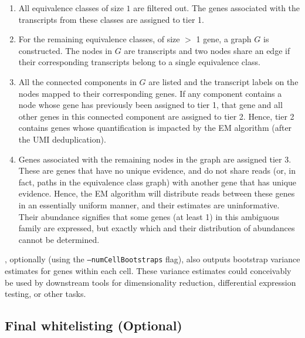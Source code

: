 \begin{enumerate}
  \item All equivalence classes of size $1$ are filtered out. The genes associated with the transcripts from these classes are assigned to tier 1.
  \item For the remaining equivalence classes, of size $>$ 1 gene, a graph $G$ is constructed. The nodes in $G$ are transcripts and two nodes share an edge if their corresponding transcripts belong to a single equivalence class. 
  \item All the connected components in $G$ are listed and the transcript labels on the nodes mapped to their corresponding genes. If any component contains a node whose gene has previously been assigned to tier 1, that gene and all other genes in this connected component are assigned to tier 2. Hence, tier 2 contains genes whose quantification is impacted by the EM algorithm (after the UMI deduplication). 
  \item Genes associated with the remaining nodes in the graph are assigned tier 3. These are genes that have no unique evidence, and do not share reads (or, in fact, paths in the equivalence class graph) with another gene that has unique evidence. Hence, the EM algorithm will distribute reads between these genes in an essentially uniform manner, and their estimates are uninformative.  Their abundance signifies that some genes (at least 1) in this ambiguous family are expressed, but exactly which and their distribution of abundances cannot be determined. 
\end{enumerate}

\Alevin, optionally (using the \texttt{{--}numCellBootstraps} flag), also outputs bootstrap variance estimates for genes within each cell. These variance estimates could conceivably be used by downstream tools for dimensionality reduction, differential expression testing, or other tasks. 

\subsection{Final whitelisting (Optional)}
\label{sec:final_whitelisting}

